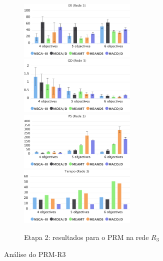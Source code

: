 \begin{figure}[!htbp]
	\caption{Etapa 2: resultados para o PRM na rede $R_3$}
	\label{fig_exp2_mrp_r3}
	\includegraphics[width=0.5\textwidth]{cap_experimentos/figs/etapa2/er-mrp-r3}
	\includegraphics[width=0.5\textwidth]{cap_experimentos/figs/etapa2/gd-mrp-r3}
	\includegraphics[width=0.5\textwidth]{cap_experimentos/figs/etapa2/ps-mrp-r3}
	\includegraphics[width=0.5\textwidth]{cap_experimentos/figs/etapa2/time-mrp-r3}
\end{figure}

Análise do PRM-R3

